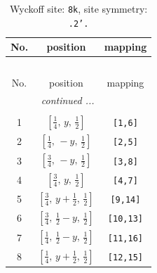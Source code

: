 \documentclass[fleqn,8pt]{jsarticle}
\begin{document}
\begin{longtable}{ccc}
\caption{Wyckoff site: {\tt 8k}, site symmetry: {\tt .2'.}}
 \\
 \hline \hline
No. & position & mapping \\ \hline \endfirsthead

\multicolumn{2}{l}{\tablename\ \thetable{}} \\
 \hline \hline
No. & position & mapping \\ \hline \endhead

 \hline \hline
\multicolumn{2}{r}{\footnotesize\it continued ...} \\ \endfoot

 \hline \hline
\multicolumn{2}{r}{} \\ \endlastfoot

1 & $\left[ \frac{1}{4},\, y,\, \frac{1}{2} \right]$ & {\tt [1,6]} \\ \hline
2 & $\left[ \frac{1}{4},\, - y,\, \frac{1}{2} \right]$ & {\tt [2,5]} \\ \hline
3 & $\left[ \frac{3}{4},\, - y,\, \frac{1}{2} \right]$ & {\tt [3,8]} \\ \hline
4 & $\left[ \frac{3}{4},\, y,\, \frac{1}{2} \right]$ & {\tt [4,7]} \\ \hline
5 & $\left[ \frac{3}{4},\, y + \frac{1}{2},\, \frac{1}{2} \right]$ & {\tt [9,14]} \\ \hline
6 & $\left[ \frac{3}{4},\, \frac{1}{2} - y,\, \frac{1}{2} \right]$ & {\tt [10,13]} \\ \hline
7 & $\left[ \frac{1}{4},\, \frac{1}{2} - y,\, \frac{1}{2} \right]$ & {\tt [11,16]} \\ \hline
8 & $\left[ \frac{1}{4},\, y + \frac{1}{2},\, \frac{1}{2} \right]$ & {\tt [12,15]} \\
\end{longtable}
\renewcommand{\arraystretch}{1.2}
\end{document}
